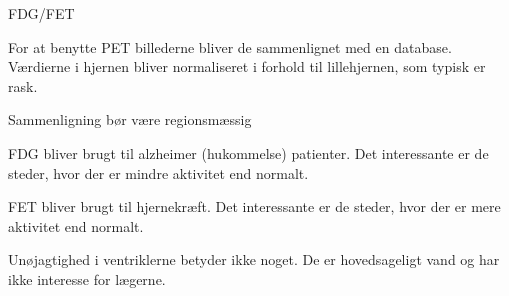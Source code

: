 FDG/FET

For at benytte PET billederne bliver de sammenlignet med en database.
Værdierne i hjernen bliver normaliseret i forhold til lillehjernen, som
typisk er rask.

Sammenligning bør være regionsmæssig

FDG bliver brugt til alzheimer (hukommelse) patienter. Det interessante
er de steder, hvor der er mindre aktivitet end normalt.

FET bliver brugt til hjernekræft. Det interessante er de steder, hvor der er
mere aktivitet end normalt.

Unøjagtighed i ventriklerne betyder ikke noget. De er hovedsageligt vand og har
ikke interesse for lægerne.







